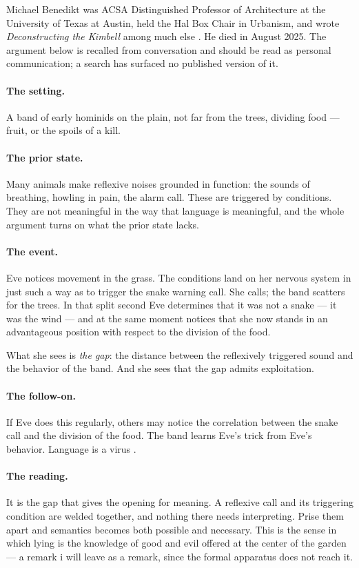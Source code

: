Michael Benedikt was ACSA Distinguished Professor of Architecture at the
University of Texas at Austin, held the Hal Box Chair in Urbanism, and wrote
\emph{Deconstructing the Kimbell} among much else \cite{benedikt1991}. He died in
August 2025. The argument below is recalled from conversation and should be read
as personal communication; a search has surfaced no published version of it.

\paragraph{The setting.} A band of early hominids on the plain, not far from the
trees, dividing food --- fruit, or the spoils of a kill.

\paragraph{The prior state.} Many animals make reflexive noises grounded in
function: the sounds of breathing, howling in pain, the alarm call. These are
triggered by conditions. They are not meaningful in the way that language is
meaningful, and the whole argument turns on what the prior state lacks.

\paragraph{The event.} Eve notices movement in the grass. The conditions land on
her nervous system in just such a way as to trigger the snake warning call. She
calls; the band scatters for the trees. In that split second Eve determines that
it was not a snake --- it was the wind --- and at the same moment notices that
she now stands in an advantageous position with respect to the division of the
food.

What she sees is \emph{the gap}: the distance between the reflexively triggered
sound and the behavior of the band. And she sees that the gap admits
exploitation.

\paragraph{The follow-on.} If Eve does this regularly, others may notice the
correlation between the snake call and the division of the food. The band learns
Eve's trick from Eve's behavior. Language is a virus \cite{burroughs1962}.

\paragraph{The reading.} It is the gap that gives the opening for meaning. A
reflexive call and its triggering condition are welded together, and nothing
there needs interpreting. Prise them apart and semantics becomes both possible
and necessary. This is the sense in which lying is the knowledge of good and evil
offered at the center of the garden --- a remark i will leave as a remark, since
the formal apparatus does not reach it.

